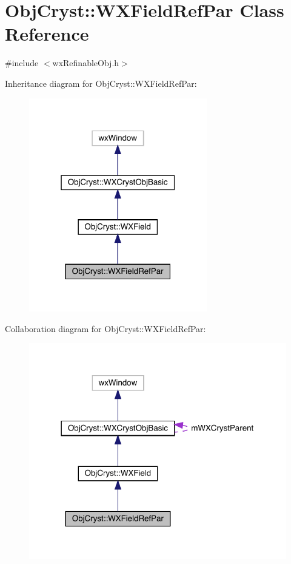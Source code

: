 \hypertarget{class_obj_cryst_1_1_w_x_field_ref_par}{}\section{Obj\+Cryst\+::W\+X\+Field\+Ref\+Par Class Reference}
\label{class_obj_cryst_1_1_w_x_field_ref_par}


{\ttfamily \#include $<$wx\+Refinable\+Obj.\+h$>$}



Inheritance diagram for Obj\+Cryst\+::W\+X\+Field\+Ref\+Par\+:
\nopagebreak
\begin{figure}[H]
\begin{center}
\leavevmode
\includegraphics[width=220pt]{class_obj_cryst_1_1_w_x_field_ref_par__inherit__graph}
\end{center}
\end{figure}


Collaboration diagram for Obj\+Cryst\+::W\+X\+Field\+Ref\+Par\+:
\nopagebreak
\begin{figure}[H]
\begin{center}
\leavevmode
\includegraphics[width=318pt]{class_obj_cryst_1_1_w_x_field_ref_par__coll__graph}
\end{center}
\end{figure}

